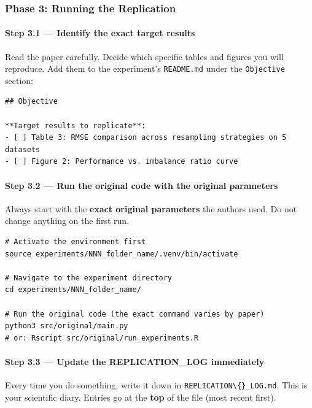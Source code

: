 \subsubsection{Phase 3: Running the
Replication}\label{phase-3-running-the-replication}

\paragraph{Step 3.1 --- Identify the exact target
results}\label{step-3.1-identify-the-exact-target-results}

Read the paper carefully. Decide which specific tables and figures you
will reproduce. Add them to the experiment's
\texttt{README.md} under the
\texttt{Objective} section:

\begin{verbatim}
## Objective

**Target results to replicate**:
- [ ] Table 3: RMSE comparison across resampling strategies on 5 datasets
- [ ] Figure 2: Performance vs. imbalance ratio curve
\end{verbatim}

\paragraph{Step 3.2 --- Run the original code with the original
parameters}\label{step-3.2-run-the-original-code-with-the-original-parameters}

Always start with the \textbf{exact original parameters} the authors
used. Do not change anything on the first run.

\begin{verbatim}
# Activate the environment first
source experiments/NNN_folder_name/.venv/bin/activate

# Navigate to the experiment directory
cd experiments/NNN_folder_name/

# Run the original code (the exact command varies by paper)
python3 src/original/main.py
# or: Rscript src/original/run_experiments.R
\end{verbatim}

\paragraph{Step 3.3 --- Update the REPLICATION\_LOG
immediately}\label{step-3.3-update-the-replication_log-immediately}

Every time you do something, write it down in
\texttt{REPLICATION\textbackslash\{\}\_LOG.md}. This is your scientific
diary. Entries go at the \textbf{top} of the file (most recent first).

